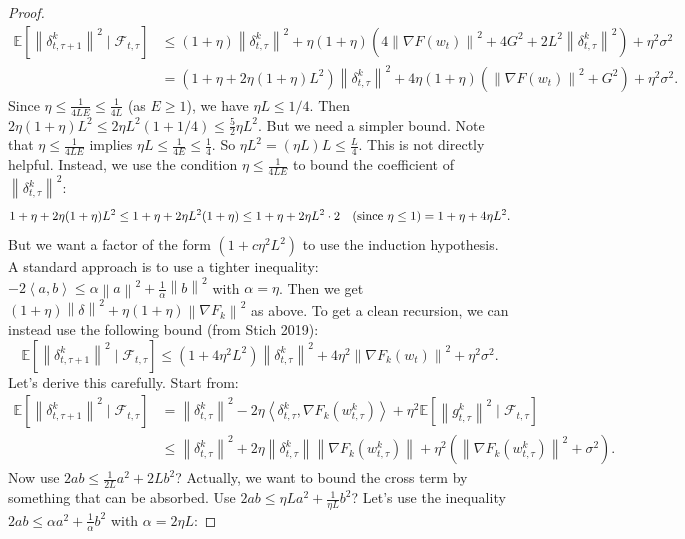 \documentclass{article}
\newcommand{\norm}[1]{\left\| #1 \right\|}
\newcommand{\inner}[2]{\left\langle #1, #2 \right\rangle}
\begin{document}
\begin{proof}
\begin{align}
\mathbb{E}[\norm{\delta_{t,\tau+1}^k}^2 \mid \mathcal{F}_{t,\tau}]
&\le (1+\eta) \norm{\delta_{t,\tau}^k}^2 + \eta(1+\eta) \left( 4\norm{\nabla F(w_t)}^2 + 4G^2 + 2L^2 \norm{\delta_{t,\tau}^k}^2 \right) + \eta^2 \sigma^2 \\
&= \left(1 + \eta + 2\eta(1+\eta)L^2 \right) \norm{\delta_{t,\tau}^k}^2 + 4\eta(1+\eta) \left( \norm{\nabla F(w_t)}^2 + G^2 \right) + \eta^2 \sigma^2.
\end{align}
Since $\eta \le \frac{1}{4LE} \le \frac{1}{4L}$ (as $E\ge 1$), we have $\eta L \le 1/4$. Then $2\eta(1+\eta)L^2 \le 2\eta L^2 (1+1/4) \le \frac{5}{2} \eta L^2$. But we need a simpler bound. Note that $\eta \le \frac{1}{4LE}$ implies $\eta L \le \frac{1}{4E} \le \frac{1}{4}$. So $\eta L^2 = (\eta L) L \le \frac{L}{4}$. This is not directly helpful. Instead, we use the condition $\eta \le \frac{1}{4LE}$ to bound the coefficient of $\norm{\delta_{t,\tau}^k}^2$:
\begin{equation}
    1 + \eta + 2\eta(1+\eta)L^2 \le 1 + \eta + 2\eta L^2 (1+\eta) \le 1 + \eta + 2\eta L^2 \cdot 2 \quad (\text{since } \eta \le 1) \\
    = 1 + \eta + 4\eta L^2.
\end{equation}
But we want a factor of the form $(1 + c \eta^2 L^2)$ to use the induction hypothesis. A standard approach is to use a tighter inequality: $-2\inner{a}{b} \le \alpha \norm{a}^2 + \frac{1}{\alpha}\norm{b}^2$ with $\alpha = \eta$. Then we get $(1+\eta)\norm{\delta}^2 + \eta(1+\eta)\norm{\nabla F_k}^2$ as above. To get a clean recursion, we can instead use the following bound (from Stich 2019):
\begin{equation}
    \mathbb{E}[\norm{\delta_{t,\tau+1}^k}^2 \mid \mathcal{F}_{t,\tau}] \le (1 + 4\eta^2 L^2) \norm{\delta_{t,\tau}^k}^2 + 4\eta^2 \norm{\nabla F_k(w_t)}^2 + \eta^2 \sigma^2.
\end{equation}
Let's derive this carefully. Start from:
\begin{align}
\mathbb{E}[\norm{\delta_{t,\tau+1}^k}^2 \mid \mathcal{F}_{t,\tau}]
&= \norm{\delta_{t,\tau}^k}^2 - 2\eta \inner{\delta_{t,\tau}^k}{\nabla F_k(w_{t,\tau}^k)} + \eta^2 \mathbb{E}[\norm{g_{t,\tau}^k}^2 \mid \mathcal{F}_{t,\tau}] \\
&\le \norm{\delta_{t,\tau}^k}^2 + 2\eta \norm{\delta_{t,\tau}^k} \norm{\nabla F_k(w_{t,\tau}^k)} + \eta^2 (\norm{\nabla F_k(w_{t,\tau}^k)}^2 + \sigma^2).
\end{align}
Now use $2ab \le \frac{1}{2L} a^2 + 2L b^2$? Actually, we want to bound the cross term by something that can be absorbed. Use $2ab \le \eta L a^2 + \frac{1}{\eta L} b^2$? Let's use the inequality $2ab \le \alpha a^2 + \frac{1}{\alpha} b^2$ with $\alpha = 2\eta L$:

\end{proof}
\end{document}
